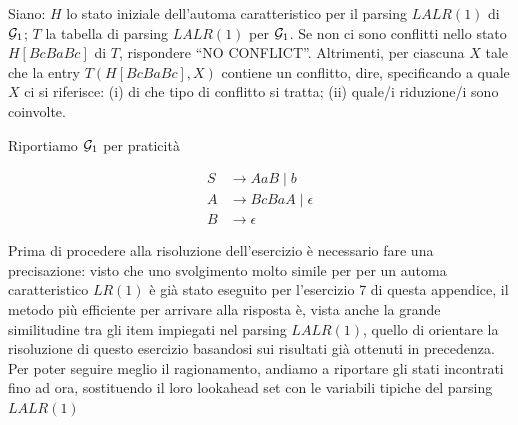 \documentclass[class=book, crop=false, oneside, 12pt]{standalone}
\begin{document}
Siano: \(H\) lo stato iniziale dell’automa caratteristico per il parsing \(LALR(1)\) di \(\mathcal{G}_1\); \(T\) la tabella di parsing \(LALR(1)\) per \(\mathcal{G}_1\). Se non ci sono conflitti nello stato \(H[BcBaBc]\) di \(T\), rispondere “NO CONFLICT”. Altrimenti, per ciascuna \(X\) tale che la entry \(T(H[BcBaBc], X)\) contiene un conflitto, dire, specificando a quale \(X\) ci si riferisce:  (i) di che tipo di conflitto si tratta; (ii) quale/i riduzione/i sono coinvolte.

Riportiamo \(\mathcal{G}_1\) per praticità

\begin{align*}
    S &\to AaB \mid b \\
    A &\to BcBaA \mid \epsilon \\
    B &\to \epsilon
\end{align*}

Prima di procedere alla risoluzione dell'esercizio è necessario fare una precisazione: visto che uno svolgimento molto simile per per un automa caratteristico \(LR(1)\) è già stato eseguito per l'esercizio 7 di questa appendice, il metodo più efficiente per arrivare alla risposta è, vista anche la grande similitudine tra gli item impiegati nel parsing \(LALR(1)\), quello di orientare la risoluzione di questo esercizio basandosi sui risultati già ottenuti in precedenza. Per poter seguire meglio il ragionamento, andiamo a riportare gli stati incontrati fino ad ora, sostituendo il loro lookahead set con le variabili tipiche del parsing \(LALR(1)\)
\end{document}
